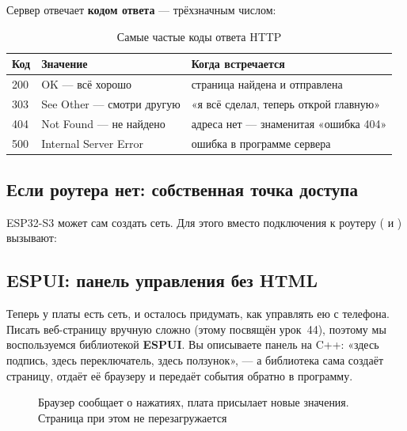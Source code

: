 Сервер отвечает \textbf{кодом ответа} --- трёхзначным числом:

\begin{table}[H]
\centering\small
\begin{tabular}{@{}lll@{}}
\toprule
Код & Значение & Когда встречается\\
\midrule
200 & OK --- всё хорошо & страница найдена и отправлена\\
303 & See Other --- смотри другую & «я всё сделал, теперь открой главную»\\
404 & Not Found --- не найдено & адреса нет --- знаменитая «ошибка 404»\\
500 & Internal Server Error & ошибка в программе сервера\\
\bottomrule
\end{tabular}
\caption{Самые частые коды ответа HTTP}
\end{table}


\subsection{Если роутера нет: собственная точка доступа}

ESP32-S3 может сам создать сеть. Для этого вместо подключения к роутеру ( и ) вызывают:



\subsection{ESPUI: панель управления без HTML}

Теперь у платы есть сеть, и осталось придумать, как управлять ею с телефона. Писать веб-страницу вручную
сложно (этому посвящён урок~44), поэтому мы воспользуемся библиотекой \textbf{ESPUI}. Вы описываете
панель на C++: «здесь подпись, здесь переключатель, здесь ползунок», --- а библиотека сама создаёт
страницу, отдаёт её браузеру и передаёт события обратно в программу.

\begin{figure}[H]
\centering
{}
\caption{Браузер сообщает о нажатиях, плата присылает новые значения. Страница при этом не перезагружается}
\end{figure}


